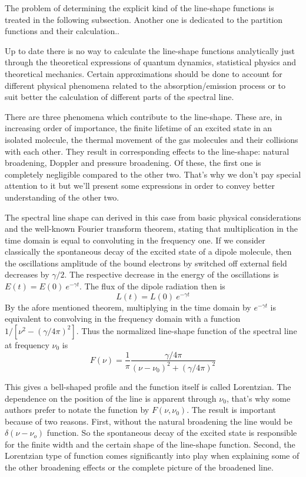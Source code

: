 The problem of determining the explicit kind of the line-shape
functions is treated in the following subsection. Another one is
dedicated to the partition functions and their calculation..


Up to date there is no way to calculate the line-shape functions
analytically just through the theoretical expressions of quantum dynamics,
statistical physics and theoretical mechanics. Certain approximations
should be done to account for different physical phenomena related to
the absorption/emission process or to suit better the calculation of
different parts of the spectral line.

There are three phenomena which contribute to the line-shape. These
are, in increasing order of importance, the finite lifetime of an
excited state in an isolated molecule, the thermal movement of the gas
molecules and their collisions with each other. They result in
corresponding effects to the line-shape: natural broadening, Doppler
and pressure broadening. Of these, the first one is completely
negligible compared to the other two. That's why we don't pay special
attention to it but we'll present some expressions in order to convey
better understanding of the other two.

The spectral line shape can derived in this case from basic physical
considerations and the well-known Fourier transform theorem, stating
that  multiplication in the time domain is equal to convoluting in the
frequency one.
If we consider classically the spontaneous decay of the excited state of a dipole molecule, then the
oscillations amplitude of the bound electrons by switched off
external field decreases by $\gamma/2$. The respective decrease
in the energy of the oscillations is $E(t)=E(0)~e^{-\gamma t}$. The flux
of the dipole radiation then is 
\begin{equation}
  L(t)=L(0)~e^{-\gamma t}
\label{}
\end{equation}
By the afore mentioned theorem, multiplying in the time domain by
$e^{-\gamma t}$ is equivalent to convolving in the frequency domain
with a function $1/[\nu^2 - (\gamma/4\pi)^2]$. Thus the normalized
line-shape function of the spectral line at frequency $\nu_0$ is 
\begin{equation}
  F(\nu)=\frac{1}{\pi}\frac{\gamma/4\pi}{(\nu - \nu_0)^2 + (\gamma/4\pi)^2}
\label{}
\end{equation}

This gives a bell-shaped profile and the function itself is called
Lorentzian. The dependence on the position of the line is apparent
through $\nu_0$, that's why some authors prefer to notate the function
by $F(\nu,\nu_0)$.
The result is important because of two reasons. First, without the
natural broadening the line would be~$\delta (\nu - \nu_o)$ function. So the
spontaneous decay of the excited state is responsible for the finite
width and the certain shape of the line-shape function. Second, the
Lorentzian type of function comes significantly into play when
explaining some of the other broadening effects or the complete
picture of the broadened line.

